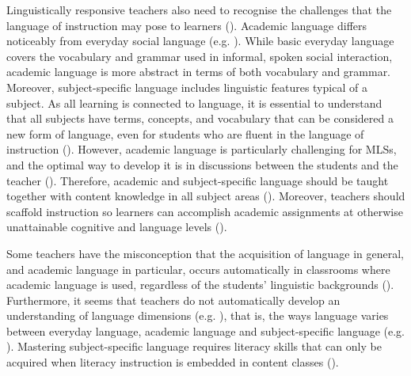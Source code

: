\documentclass[output=paper]{langscibook}
\begin{document}
Linguistically responsive teachers also need to recognise the challenges that the language of instruction may pose to learners (\citealt{Cummins2021,Gibbons2014,LucasVillegas2013,SchleppegrellEtAl2004}). Academic language differs noticeably from everyday social language (e.g. \citealt{Beacco2017,BeaccoEtAl2016,Cummins2021,SchleppegrellEtAl2004}). While basic everyday language covers the vocabulary and grammar used in informal, spoken social interaction, academic language is more abstract in terms of both vocabulary and grammar. Moreover, subject-specific language includes linguistic features typical of a subject. As all learning is connected to language, it is essential to understand that all subjects have terms, concepts, and vocabulary that can be considered a new form of language, even for students who are fluent in the language of instruction (\citealt{LahtiEtAl2020}). However, academic language is particularly challenging for MLSs, and the optimal way to develop it is in discussions between the students and the teacher (\citealt{TharpEtAl2018}). Therefore, academic and subject-specific language should be taught together with content knowledge in all subject areas (\citealt{CarlsonEtAl2018}). Moreover, teachers should scaffold instruction so learners can accomplish academic assignments at otherwise unattainable cognitive and language levels (\citealt{Gibbons2014,TharpEtAl2018,VillegasEtAl2018,Vygotsky1986}).

Some teachers have the misconception that the acquisition of language in general, and academic language in particular, occurs automatically in classrooms where academic language is used, regardless of the students’ linguistic backgrounds (\citealt{CarlsonEtAl2018}). Furthermore, it seems that teachers do not automatically develop an understanding of language dimensions (e.g. \citealt{Alisaari2020_Apples}), that is, the ways language varies between everyday language, academic language and subject-specific language (e.g. \citealt{BeaccoEtAl2016}). Mastering subject-specific language requires literacy skills that can only be acquired when literacy instruction is embedded in content classes (\citealt{ShanahanShanahan2008}).
\end{document}

